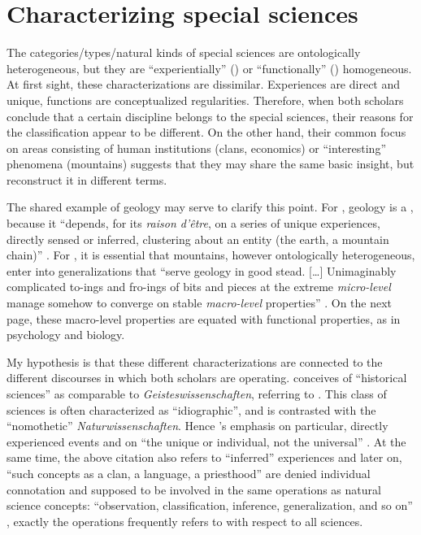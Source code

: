 \documentclass[output=paper]{langscibook}
\begin{document}
\section{Characterizing special sciences}
\label{sec:elffers:characterizing}

 
The categories/types/natural kinds of special sciences are ontologically heterogeneous, but they are  
``experientially'' ({\Sapir}) or ``functionally'' ({\Fodor}) homogeneous. At first sight, these characterizations are dissimilar. Experiences are direct and unique, functions are conceptualized regularities. Therefore, when both scholars conclude that a certain discipline belongs to the special sciences, their reasons for the classification appear to be different. On the other hand, their common focus on areas consisting of human institutions (clans, economics) or ``interesting'' phenomena (mountains) suggests that they may share the same basic insight, but reconstruct it in different terms.
 

The shared example of geology may serve to clarify this point. For {\Sapir}, geology is a , because it ``depends, for its \emph{raison d’être}, on a series of unique experiences, directly sensed or inferred, clustering about an entity (the earth, a mountain chain)'' \citep[445]{Sapir1917}. For {\Fodor}, it is essential that mountains, however ontologically heterogeneous, enter into generalizations that ``serve geology in good stead. […] Unimaginably complicated to-ings and fro-ings of bits and pieces at the extreme \emph{micro-level} manage somehow to converge on stable \emph{macro-level} properties'' \citep[160]{Fodor1997}. On the next page, these macro-level properties are equated with functional properties, as in psychology and biology.

My hypothesis is that these different characterizations are connected to the different discourses in which both scholars are operating. {\Sapir} conceives of ``historical sciences'' as comparable to \emph{Geisteswissenschaften}, referring to \citet{Rickert1913}. This class of sciences is often characterized as ``idiographic'', and is contrasted with the ``nomothetic'' \emph{Naturwissenschaften}. Hence {\Sapir}'s emphasis on particular, directly experienced events and on ``the unique or individual, not the universal'' \citep[446]{Sapir1917}. At the same time, the above citation also refers to ``inferred'' experiences and later on, ``such concepts as a clan, a language, a priesthood'' are denied individual connotation and supposed to be involved in the same operations as natural science concepts: ``observation, classification, inference, generalization, and so on'' \citep[446]{Sapir1917}, exactly the operations {\Fodor} frequently refers to with respect to all sciences.
\end{document}
